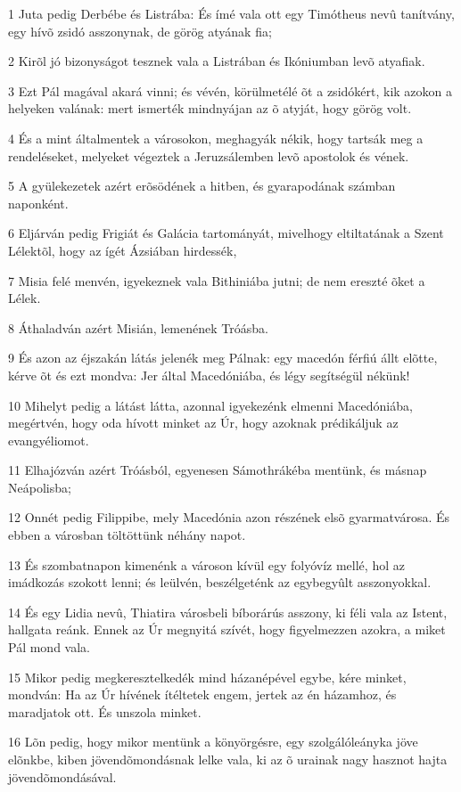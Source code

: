 \par 1 Juta pedig Derbébe és Listrába: És ímé vala ott egy Timótheus nevû tanítvány, egy hívõ zsidó asszonynak, de görög atyának fia;
\par 2 Kirõl jó bizonyságot tesznek vala a Listrában és Ikóniumban levõ atyafiak.
\par 3 Ezt Pál magával akará vinni; és vévén, körülmetélé õt a zsidókért, kik azokon a helyeken valának: mert ismerték mindnyájan az õ atyját, hogy görög volt.
\par 4 És a mint általmentek a városokon, meghagyák nékik, hogy tartsák meg a rendeléseket, melyeket végeztek a Jeruzsálemben levõ apostolok és vének.
\par 5 A gyülekezetek azért erõsödének a hitben, és gyarapodának számban naponként.
\par 6 Eljárván pedig Frigiát és Galácia tartományát, mivelhogy eltiltatának a Szent Lélektõl, hogy az ígét Ázsiában hirdessék,
\par 7 Misia felé menvén, igyekeznek vala Bithiniába jutni; de nem ereszté õket a Lélek.
\par 8 Áthaladván azért Misián, lemenének Tróásba.
\par 9 És azon az éjszakán látás jelenék meg Pálnak: egy macedón férfiú állt elõtte, kérve õt és ezt mondva: Jer által Macedóniába, és légy segítségül nékünk!
\par 10 Mihelyt pedig a látást látta, azonnal igyekezénk elmenni Macedóniába, megértvén, hogy oda hívott minket az Úr, hogy azoknak prédikáljuk az evangyéliomot.
\par 11 Elhajózván azért Tróásból, egyenesen Sámothrákéba mentünk, és másnap Neápolisba;
\par 12 Onnét pedig Filippibe, mely Macedónia azon részének elsõ gyarmatvárosa. És ebben a városban töltöttünk néhány napot.
\par 13 És szombatnapon kimenénk a városon kívül egy folyóvíz mellé, hol az imádkozás szokott lenni; és leülvén, beszélgeténk az egybegyûlt asszonyokkal.
\par 14 És egy Lidia nevû, Thiatira városbeli bíborárús asszony, ki féli vala az Istent, hallgata reánk. Ennek az Úr megnyitá szívét, hogy figyelmezzen azokra, a miket Pál mond vala.
\par 15 Mikor pedig megkeresztelkedék mind házanépével egybe, kére minket, mondván: Ha az Úr hívének ítéltetek engem, jertek az én házamhoz, és maradjatok ott. És unszola minket.
\par 16 Lõn pedig, hogy mikor mentünk a könyörgésre, egy szolgálóleányka jöve elõnkbe, kiben jövendõmondásnak lelke vala, ki az õ urainak nagy hasznot hajta jövendõmondásával.
